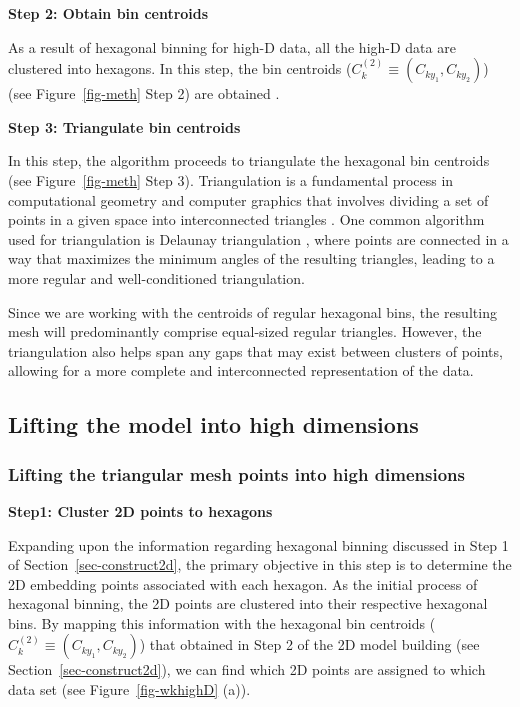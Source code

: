 \documentclass[
  12pt]{article}
\begin{document}
\textbf{Step 2: Obtain bin centroids}

As a result of hexagonal binning for high-D data, all the high-D data
are clustered into hexagons. In this step, the bin centroids
(\(C_k^{(2)} \equiv (C_{ky_1}, C_{ky_2})\)) (see Figure~\ref{fig-meth}
Step 2) are obtained \citep{Carr2013}.

\textbf{Step 3: Triangulate bin centroids}

In this step, the algorithm proceeds to triangulate the hexagonal bin
centroids (see Figure~\ref{fig-meth} Step 3). Triangulation is a
fundamental process in computational geometry and computer graphics that
involves dividing a set of points in a given space into interconnected
triangles \citep{article30}. One common algorithm used for triangulation
is Delaunay triangulation \citep[\citet{article54}]{article26}, where
points are connected in a way that maximizes the minimum angles of the
resulting triangles, leading to a more regular and well-conditioned
triangulation.

Since we are working with the centroids of regular hexagonal bins, the
resulting mesh will predominantly comprise equal-sized regular
triangles. However, the triangulation also helps span any gaps that may
exist between clusters of points, allowing for a more complete and
interconnected representation of the data.

\hypertarget{lifting-the-model-into-high-dimensions}{%
\subsection{Lifting the model into high
dimensions}\label{lifting-the-model-into-high-dimensions}}

\hypertarget{lifting-the-triangular-mesh-points-into-high-dimensions}{%
\subsubsection{Lifting the triangular mesh points into high
dimensions}\label{lifting-the-triangular-mesh-points-into-high-dimensions}}

\textbf{Step1: Cluster 2D points to hexagons}

Expanding upon the information regarding hexagonal binning discussed in
Step 1 of Section~\ref{sec-construct2d}, the primary objective in this
step is to determine the 2D embedding points associated with each
hexagon. As the initial process of hexagonal binning, the 2D points are
clustered into their respective hexagonal bins. By mapping this
information with the hexagonal bin centroids
(\(C_k^{(2)} \equiv (C_{ky_1}, C_{ky_2})\)) that obtained in Step 2 of
the 2D model building (see Section~\ref{sec-construct2d}), we can find
which 2D points are assigned to which data set (see
Figure~\ref{fig-wkhighD} (a)).
\end{document}
